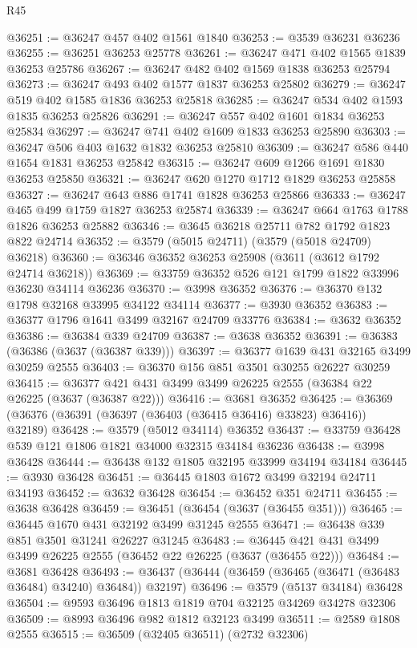 \begin{lexlean}{R45}
\begin{coremodule}
@36251 := @36247 @457 @402 @1561 @1840
@36253 := @3539 @36231 @36236
@36255 := @36251 @36253 @25778
@36261 := @36247 @471 @402 @1565 @1839 @36253 @25786
@36267 := @36247 @482 @402 @1569 @1838 @36253 @25794
@36273 := @36247 @493 @402 @1577 @1837 @36253 @25802
@36279 := @36247 @519 @402 @1585 @1836 @36253 @25818
@36285 := @36247 @534 @402 @1593 @1835 @36253 @25826
@36291 := @36247 @557 @402 @1601 @1834 @36253 @25834
@36297 := @36247 @741 @402 @1609 @1833 @36253 @25890
@36303 := @36247 @506 @403 @1632 @1832 @36253 @25810
@36309 := @36247 @586 @440 @1654 @1831 @36253 @25842
@36315 := @36247 @609 @1266 @1691 @1830 @36253 @25850
@36321 := @36247 @620 @1270 @1712 @1829 @36253 @25858
@36327 := @36247 @643 @886 @1741 @1828 @36253 @25866
@36333 := @36247 @465 @499 @1759 @1827 @36253 @25874
@36339 := @36247 @664 @1763 @1788 @1826 @36253 @25882
@36346 := @3645 @36218 @25711 @782 @1792 @1823 @822 @24714
@36352 := @3579 (@5015 @24711) (@3579 (@5018 @24709) @36218)
@36360 := @36346 @36352 @36253 @25908 (@3611 (@3612 @1792 @24714 @36218))
@36369 := @33759 @36352 @526 @121 @1799 @1822 @33996 @36230 @34114 @36236
@36370 := @3998 @36352
@36376 := @36370 @132 @1798 @32168 @33995 @34122 @34114
@36377 := @3930 @36352
@36383 := @36377 @1796 @1641 @3499 @32167 @24709 @33776
@36384 := @3632 @36352
@36386 := @36384 @339 @24709
@36387 := @3638 @36352
@36391 := @36383 (@36386 (@3637 (@36387 @339)))
@36397 := @36377 @1639 @431 @32165 @3499 @30259 @2555
@36403 := @36370 @156 @851 @3501 @30255 @26227 @30259
@36415 := @36377 @421 @431 @3499 @3499 @26225 @2555 (@36384 @22 @26225 (@3637 (@36387 @22)))
@36416 := @3681 @36352
@36425 := @36369 (@36376 (@36391 (@36397 (@36403 (@36415 @36416) @33823) @36416)) @32189)
@36428 := @3579 (@5012 @34114) @36352
@36437 := @33759 @36428 @539 @121 @1806 @1821 @34000 @32315 @34184 @36236
@36438 := @3998 @36428
@36444 := @36438 @132 @1805 @32195 @33999 @34194 @34184
@36445 := @3930 @36428
@36451 := @36445 @1803 @1672 @3499 @32194 @24711 @34193
@36452 := @3632 @36428
@36454 := @36452 @351 @24711
@36455 := @3638 @36428
@36459 := @36451 (@36454 (@3637 (@36455 @351)))
@36465 := @36445 @1670 @431 @32192 @3499 @31245 @2555
@36471 := @36438 @339 @851 @3501 @31241 @26227 @31245
@36483 := @36445 @421 @431 @3499 @3499 @26225 @2555 (@36452 @22 @26225 (@3637 (@36455 @22)))
@36484 := @3681 @36428
@36493 := @36437 (@36444 (@36459 (@36465 (@36471 (@36483 @36484) @34240) @36484)) @32197)
@36496 := @3579 (@5137 @34184) @36428
@36504 := @9593 @36496 @1813 @1819 @704 @32125 @34269 @34278 @32306
@36509 := @8993 @36496 @982 @1812 @32123 @3499
@36511 := @2589 @1808 @2555
@36515 := @36509 (@32405 @36511) (@2732 @32306)

\end{coremodule}
\end{lexlean}

